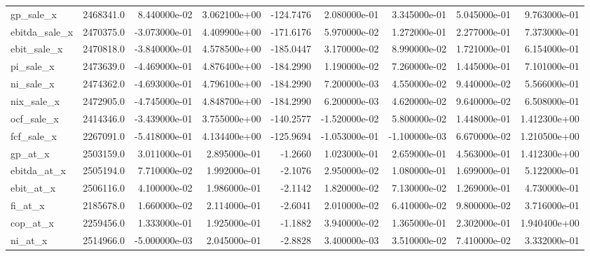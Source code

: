 \documentclass[10pt]{article}
\begin{document}
\begin{landscape}
\begin{longtable}{|l|r|r|r|r|r|r|r|r|}
gp\_sale\_x               &  2468341.0 &  8.440000e-02 &  3.062100e+00 &   -124.7476 &  2.080000e-01 &  3.345000e-01 &  5.045000e-01 &  9.763000e-01 \\
ebitda\_sale\_x           &  2470375.0 & -3.073000e-01 &  4.409900e+00 &   -171.6176 &  5.970000e-02 &  1.272000e-01 &  2.277000e-01 &  7.373000e-01 \\
ebit\_sale\_x             &  2470818.0 & -3.840000e-01 &  4.578500e+00 &   -185.0447 &  3.170000e-02 &  8.990000e-02 &  1.721000e-01 &  6.154000e-01 \\
pi\_sale\_x               &  2473639.0 & -4.469000e-01 &  4.876400e+00 &   -184.2990 &  1.190000e-02 &  7.260000e-02 &  1.445000e-01 &  7.101000e-01 \\
ni\_sale\_x               &  2474362.0 & -4.693000e-01 &  4.796100e+00 &   -184.2990 &  7.200000e-03 &  4.550000e-02 &  9.440000e-02 &  5.566000e-01 \\
nix\_sale\_x              &  2472905.0 & -4.745000e-01 &  4.848700e+00 &   -184.2990 &  6.200000e-03 &  4.620000e-02 &  9.640000e-02 &  6.508000e-01 \\
ocf\_sale\_x              &  2414346.0 & -3.439000e-01 &  3.755000e+00 &   -140.2577 & -1.520000e-02 &  5.800000e-02 &  1.448000e-01 &  1.412300e+00 \\
fcf\_sale\_x              &  2267091.0 & -5.418000e-01 &  4.134400e+00 &   -125.9694 & -1.053000e-01 & -1.100000e-03 &  6.670000e-02 &  1.210500e+00 \\
gp\_at\_x                 &  2503159.0 &  3.011000e-01 &  2.895000e-01 &     -1.2660 &  1.023000e-01 &  2.659000e-01 &  4.563000e-01 &  1.412300e+00 \\
ebitda\_at\_x             &  2505194.0 &  7.710000e-02 &  1.992000e-01 &     -2.1076 &  2.950000e-02 &  1.080000e-01 &  1.699000e-01 &  5.122000e-01 \\
ebit\_at\_x               &  2506116.0 &  4.100000e-02 &  1.986000e-01 &     -2.1142 &  1.820000e-02 &  7.130000e-02 &  1.269000e-01 &  4.730000e-01 \\
fi\_at\_x                 &  2185678.0 &  1.660000e-02 &  2.114000e-01 &     -2.6041 &  2.010000e-02 &  6.410000e-02 &  9.800000e-02 &  3.716000e-01 \\
cop\_at\_x                &  2259456.0 &  1.333000e-01 &  1.925000e-01 &     -1.1882 &  3.940000e-02 &  1.365000e-01 &  2.302000e-01 &  1.940400e+00 \\
ni\_at\_x                 &  2514966.0 & -5.000000e-03 &  2.045000e-01 &     -2.8828 &  3.400000e-03 &  3.510000e-02 &  7.410000e-02 &  3.332000e-01 \\

\end{longtable}
\end{landscape}
\end{document}
